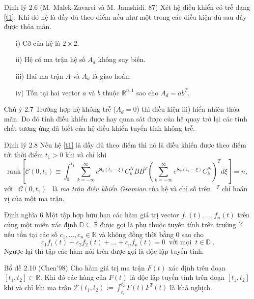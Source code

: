 \documentclass[10pt,notheorems]{beamer}
\newcommand{\R}{\mathbb{R}}
\theoremstyle{definition}
\theoremstyle{definition}
\theoremstyle{definition}
\def\R{\mathbb{R}}
\def\cP{\mathcal{P}}
\def\R{\mathbb{R}}
\begin{document}
\begin{frame}{}
	\begin{block}{Định lý 2.6 (M. Malek-Zavarei và M. Jamshidi. 87)}
		Xét hệ điều khiển có trễ dạng \eqref{t1}. Khi đó hệ là đầy đủ theo điểm nếu như một trong các điều kiện đủ sau đây được thỏa mãn.
		\begin{enumerate}
			\item[i)] Cỡ của hệ là $2\times 2$. 
			\item[ii)] Hệ có ma trận hệ số $A_d$ không suy biến.
			\item[iii)] Hai ma trận $A$ và $A_d$ là giao hoán.
			\item[iv)] Tồn tại hai vector $a$ và $b$ thuộc $\R^{n,1}$ sao cho 
			$A_d = a b^T$.
		\end{enumerate}
	\end{block}
	
	\begin{block}{Chú ý 2.7}
		Trường hợp hệ không trễ ($A_d=0$) thì điều kiện iii) hiển nhiên thỏa mãn. Do đó tính điều khiển được hay quan sát được của hệ quay trở lại các tính chất tương ứng đã biết của hệ điều khiển tuyến tính không trễ.
	\end{block}
\end{frame}	


\begin{frame}{}
	\begin{block}{Định lý 2.8}
		Nếu hệ \eqref{t1} là đầy đủ theo điểm thì nó là điều khiển được theo điểm tới thời điểm $t_1 > 0$ khi và chỉ khi\pause
		\begin{equation}\label{t8}
		\text{rank}\left[\mathcal{C}(0,t_1)\equiv \int^{t_1}_0\sum\limits^\infty_{k=-\infty}e^{\mathbf{S}_k(t_1-\xi)}C^N_k {BB}^T\left(\sum\limits^\infty_{k=-\infty}e^{\mathbf{S}_k(t_1-\xi)}C^N_k\right)^Td\xi\right]=n,
		\end{equation}\pause
		với \ $\mathcal{C}(0,t_1)$ \ là \textit{ma trận điều khiển Gramian} của hệ và chỉ số trên \ $^T$ chỉ hoán vị của một ma trận.
	\end{block}		
\end{frame}	


\begin{frame}{}
		\begin{block}{Định nghĩa 6}
			Một tập hợp hữu hạn các hàm giá trị vector $f_1(t),\dots,f_n(t)$ trên cùng một miền xác định $\mathbb{D} \subseteq \R$ được gọi là phụ thuộc tuyến tính trên trường $\mathbb{K}$ nếu tồn tại các số $c_1,\dots,c_n \in \mathbb{K}$ và không đồng thời bằng $0$ sao cho
			\[
			c_1 f_1(t) + c_2 f_2(t) + \dots + c_n f_n(t) = 0 \ \mbox{ với mọi } \ t\in \mathbb{D} \ .
			\]
			Ngược lại thì tập các hàm nói trên được gọi là độc lập tuyến tính.
		\end{block}
	
	\begin{block}{Bổ đề 2.10 (Chen'98)}
		Cho hàm giá trị ma trận $F(t)$ xác định trên đoạn $[t_1,t_2] \subset \R$. Khi đó các hàng của $F(t)$ là độc lập tuyến tính trên đoạn $[t_1,t_2]$ khi và chỉ khi ma trận $\cP(t_1,t_2) := \int_{t_1}^{t_2} F(t)F^T(t)$ là khả nghịch.
		\end{block}
\end{frame}
\end{document}
